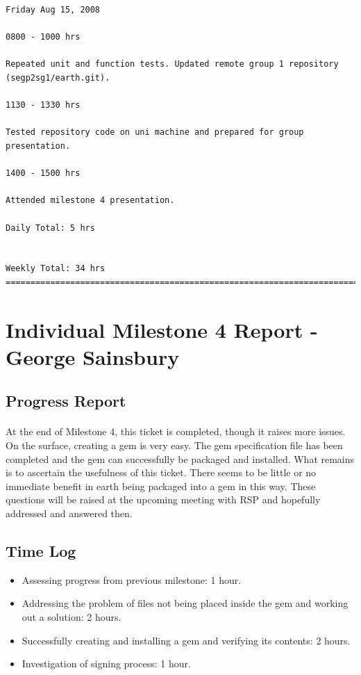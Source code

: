 \documentclass[10pt,a4,oneside]{article}
\newenvironment{mylisting}
{\begin{list}{}{\setlength{\leftmargin}{1em}}\item\scriptsize\bfseries}
{\end{list}}
\begin{document}
\begin{mylisting}
\begin{verbatim}
Friday Aug 15, 2008

0800 - 1000 hrs

Repeated unit and function tests. Updated remote group 1 repository (segp2sg1/earth.git).

1130 - 1330 hrs

Tested repository code on uni machine and prepared for group presentation.

1400 - 1500 hrs

Attended milestone 4 presentation.

Daily Total: 5 hrs


Weekly Total: 34 hrs
========================================================================
\end{verbatim}
\end{mylisting}

\newpage

\section{Individual Milestone 4 Report - George Sainsbury}

\subsection*{Progress Report}

\paragraph{}
At the end of Milestone 4, this ticket is completed, though it raises more issues. On the surface, creating a gem is very easy. The gem specification file has been completed and the gem can successfully be packaged and installed. What remains is to ascertain the usefulness of this ticket. There seems to be little or no immediate benefit in earth being packaged into a gem in this way. These questions will be raised at the upcoming meeting with RSP and  hopefully addressed and answered then.

\subsection*{Time Log}
\begin{itemize}
 \item Assessing progress from previous milestone: 1 hour.
 \item Addressing the problem of files not being placed inside the  
gem and working out a solution: 2 hours.
 \item Successfully creating and installing a gem and verifying its  
contents: 2 hours.
 \item Investigation of signing process: 1 hour.
\end{itemize}
\end{document}

